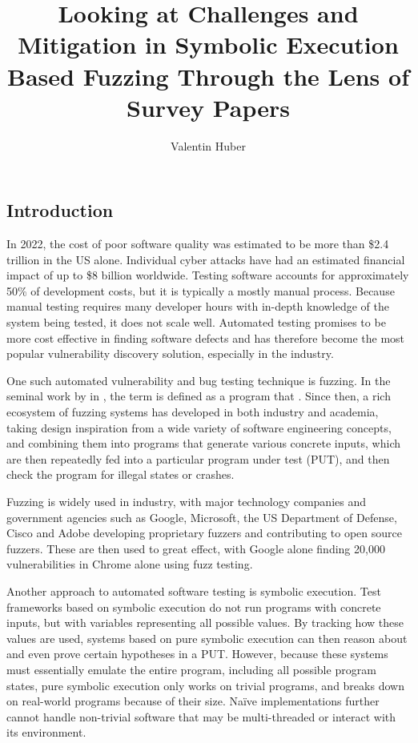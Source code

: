 \documentclass{article}
\title{Looking at Challenges and Mitigation in Symbolic Execution Based Fuzzing Through the Lens of Survey Papers}
\author{Valentin Huber}
\begin{document}


\maketitle


\tableofcontents
\pagebreak
\begin{multicols}{2}
    \section{Introduction}
    In 2022, the cost of poor software quality was estimated to be more than \$2.4 trillion in the US alone.\cite{CostPoorSoftware} Individual cyber attacks have had an estimated financial impact of up to \$8 billion worldwide.\cite{Demystifying} Testing software accounts for approximately 50\% of development costs\cite{DART}, but it is typically a mostly manual process\cite{PreliminaryAssessment}. Because manual testing requires many developer hours with in-depth knowledge of the system being tested, it does not scale well. Automated testing promises to be more cost effective in finding software defects and has therefore become the most popular vulnerability discovery solution, especially in the industry.\cite{FuzzingASurvey}

    One such automated vulnerability and bug testing technique is fuzzing.\cite{VulnerabilityDiscoveryTechniques} In the seminal work by \citeauthor{UNIX} in \citeyear{UNIX}, the term  is defined as a program that \cite{UNIX}. Since then, a rich ecosystem of fuzzing systems has developed in both industry and academia, taking design inspiration from a wide variety of software engineering concepts, and combining them into programs that generate various concrete inputs, which are then repeatedly fed into a particular program under test (PUT), and then check the program for illegal states or crashes.\cite{EvaluatingFuzzTesting}

    Fuzzing is widely used in industry, with major technology companies and government agencies such as Google, Microsoft, the US Department of Defense, Cisco and Adobe developing proprietary fuzzers and contributing to open source fuzzers. These are then used to great effect, with Google alone finding 20,000 vulnerabilities in Chrome alone using fuzz testing.\cite{Demystifying}

    Another approach to automated software testing is symbolic execution\cite{Symbex}. Test frameworks based on symbolic execution do not run programs with concrete inputs, but with variables representing all possible values. By tracking how these values are used, systems based on pure symbolic execution can then reason about and even prove certain hypotheses in a PUT. However, because these systems must essentially emulate the entire program, including all possible program states, pure symbolic execution only works on trivial programs, and breaks down on real-world programs because of their size. Naïve implementations further cannot handle non-trivial software that may be multi-threaded or interact with its environment.


\end{multicols}
\end{document}
